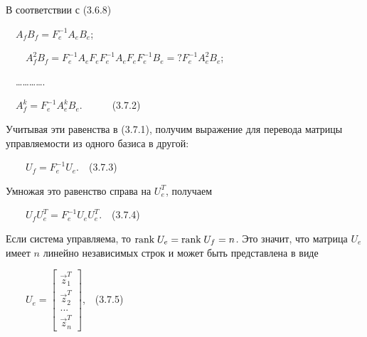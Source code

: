 \documentclass[a4paper]{article}
\newcommand\normalsubformula[1]{\text{\mathversion{normal}$#1$}}
\begin{document}
{\begin{russian}\sffamily
В соответствии с (3.6.8)
\end{russian}}

{\begin{russian}\sffamily
\ \  $A_fB_f=F_e^{-1}A_eB_e$;
\end{russian}}

{\begin{russian}\sffamily
\ \ \ \  $A_f^2B_f=F_e^{-1}A_eF_eF_e^{-1}A_eF_eF_e^{-1}B_e=?F_e^{-1}A_e^2B_e$;
\end{russian}}

{\begin{russian}\sffamily
\ \ ………….
\end{russian}}

{\begin{russian}\sffamily
\ \  $A_f^k=F_e^{-1}A_e^kB_e$.\ \ \ \ \ \ (3.7.2)
\end{russian}}

{\begin{russian}\sffamily
Учитывая эти равенства в (3.7.1), получим выражение для перевода матрицы управляемости из одного базиса в другой:
\end{russian}}

{\begin{russian}\sffamily
\ \ \ \  $U_f=F_e^{-1}U_e$.\ \ (3.7.3)
\end{russian}}

{\begin{russian}\sffamily
Умножая это равенство справа на  $U_e^T$, полу­чаем
\end{russian}}

{\begin{russian}\sffamily
\ \ \ \  $U_fU_e^T=F_e^{-1}U_eU_e^T$.\ \ (3.7.4)
\end{russian}}

{\begin{russian}\sffamily
Если система управляема, то  $\normalsubformula{\text{rank}}\;U_e=\normalsubformula{\text{rank}}\;U_f=n$\textit{.} Это
значит, что матрица  $U_e$ имеет  $n$\textit{ }линейно независимых строк и может быть представлена в виде
\end{russian}}

{\begin{russian}\sffamily
\ \ \ \  $U_e=\left[\begin{matrix}\vec z_1^T\\\vec z_2^T\\...\\\vec z_n^T\end{matrix}\right]$,\ \ (3.7.5)
\end{russian}}
\end{document}
